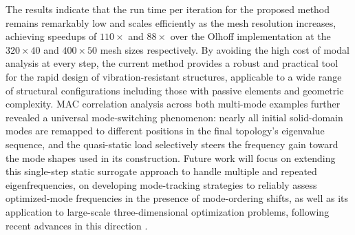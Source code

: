 \documentclass[applsci,article,submit,pdftex,moreauthors]{Definitions/mdpi}
\begin{document}
The results indicate that the run time per iteration for the proposed method remains remarkably low and scales efficiently as the mesh resolution increases, achieving speedups of $110\times$ and $88\times$ over the Olhoff implementation at the $320{\times}40$ and $400{\times}50$ mesh sizes respectively. By avoiding the high cost of modal analysis at every step, the current method provides a robust and practical tool for the rapid design of vibration-resistant structures, applicable to a wide range of structural configurations including those with passive elements and geometric complexity. MAC correlation analysis across both multi-mode examples further revealed a universal mode-switching phenomenon: nearly all initial solid-domain modes are remapped to different positions in the final topology's eigenvalue sequence, and the quasi-static load selectively steers the frequency gain toward the mode shapes used in its construction. Future work will focus on extending this single-step static surrogate approach to handle multiple and repeated eigenfrequencies, on developing mode-tracking strategies to reliably assess optimized-mode frequencies in the presence of mode-ordering shifts, as well as its application to large-scale three-dimensional optimization problems, following recent advances in this direction \citep{HUANG2025,DENG2024}.

\vspace{6pt}





\end{document}

